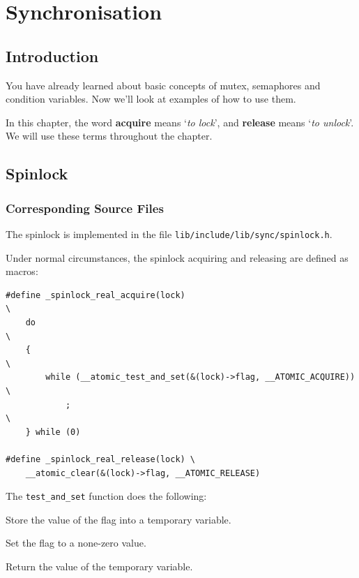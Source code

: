 \chapter{Synchronisation}

\section{Introduction}

You have already learned about basic concepts of mutex, semaphores and condition variables. Now we'll
look at examples of how to use them.

In this chapter, the word \textbf{acquire} means `\textit{to lock}', and \textbf{release} means
`\textit{to unlock}'. We will use these terms throughout the chapter.

\section{Spinlock}

\subsection{Corresponding Source Files}

The spinlock is implemented in the file \texttt{lib/include/lib/sync/spinlock.h}.

Under normal circumstances, the spinlock acquiring and releasing are defined as macros:

\begin{verbatim}
#define _spinlock_real_acquire(lock)                                    \
    do                                                                  \
    {                                                                   \
        while (__atomic_test_and_set(&(lock)->flag, __ATOMIC_ACQUIRE))  \
            ;                                                           \
    } while (0)

#define _spinlock_real_release(lock) \
    __atomic_clear(&(lock)->flag, __ATOMIC_RELEASE)
\end{verbatim}

\begin{tip*}{The \texttt{test\_and\_set} function does the following:}
    \item Store the value of the flag into a temporary variable.
    \item Set the flag to a none-zero value.
    \item Return the value of the temporary variable.
\end{tip*}

